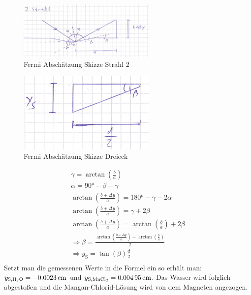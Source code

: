 \documentclass[
	a4paper,
	12pt,
	pagesize,
	ngerman
]{scrartcl}
\begin{document}
	\begin{figure}[htb]
	  \centering
	    \includegraphics[width=0.6\textwidth]{Fermi2} 
	  \caption{Fermi Abschätzung Skizze Strahl 2}
	\end{figure}
	\begin{figure}[htb]
	  \centering
	    \includegraphics[width=0.6\textwidth]{Fermi3} 
	  \caption{Fermi Abschätzung Skizze Dreieck}
	\end{figure}

	\begin{gather*}
		\gamma = \arctan \left(\frac{b}{a}\right) \\
		\alpha = \ang{90} - \beta - \gamma \\
		\arctan \left(\frac{b+\Delta y}{a}\right) = \ang{180} - \gamma - 2\alpha \\
		\arctan \left(\frac{b+\Delta y}{a}\right) = \gamma + 2 \beta \\
		\arctan \left(\frac{b+\Delta y}{a}\right) =   \arctan \left(\frac{b}{a}\right) + 2 \beta \\
		\Rightarrow \beta = \frac{\arctan \left(\frac{b+\Delta y}{a}\right) -  \arctan \left(\frac{b}{a}\right)}{2} \\
		\Rightarrow y_\text{S} = \tan (\beta) \frac{d}{2}  \\
	\end{gather*}
	Setzt man die gemessenen Werte in die Formel ein so erhält man: $ y_{\text{S,\ce{H2O}}} = \SI{-0,0023}{ cm} $ und $y_{\text{S,\ce{MnCl2}}} = \SI{0,00495}{ cm} $. Das Wasser wird folglich abgestoßen und die Mangan-Chlorid-Lösung wird von dem Magneten angezogen.
	
\end{document}
